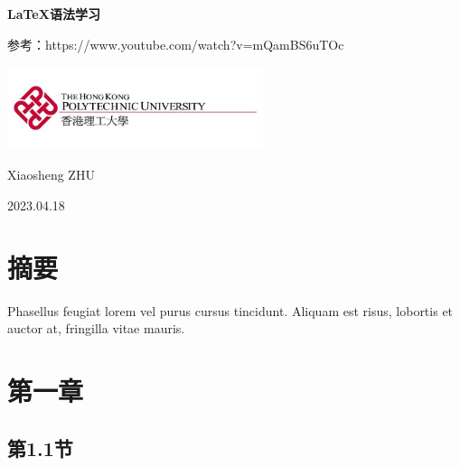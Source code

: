 \documentclass[11pt]{article}
\begin{document}
\begin{titlepage}
\begin{center}
\vspace*{5cm} %
\Huge \textbf{\LaTeX 语法学习}

\vspace{6cm}

\small 参考：https://www.youtube.com/watch?v=mQamBS6uTOc

\vfill %

\includegraphics[width=7.5cm]{polyu_logo.jpg} %

\Large Xiaosheng ZHU

\large 2023.04.18
\end{center}
\end{titlepage}

\pagebreak
{} %
\section*{摘要} %
Phasellus feugiat lorem vel purus cursus tincidunt. Aliquam est risus, lobortis et auctor at, fringilla vitae mauris. 

\pagebreak
\renewcommand\contentsname{目录} %
\tableofcontents

\pagebreak
{} %
\setcounter{page}{1} %
\section{第一章}
\subsection{第1.1节}
\lipsum[1-2]
\end{document}
